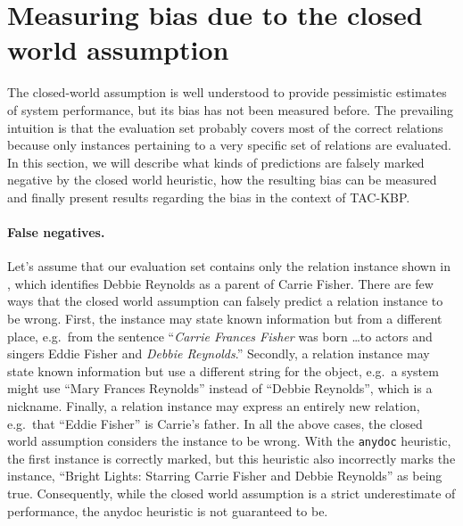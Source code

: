 \section{Measuring bias due to the closed world assumption}
\label{sec:analysis}


The closed-world assumption is well understood to provide pessimistic estimates of system performance, but its bias has not been measured before.
The prevailing intuition is that the evaluation set probably covers most of the correct relations because only instances pertaining to a very specific set of relations are evaluated.
In this section, we will describe what kinds of predictions are falsely marked negative by the closed world heuristic, how the resulting bias can be measured and finally present results regarding the bias in the context of TAC-KBP.

\paragraph{False negatives.}
Let's assume that our evaluation set contains only the relation instance shown in , which identifies Debbie Reynolds as a parent of Carrie Fisher.
There are few ways that the closed world assumption can falsely predict a relation instance to be wrong.
First, the instance may state known information but from a different place, e.g.\ from the sentence 
  ``\textit{Carrie Frances Fisher} was born \ldots to actors and singers Eddie Fisher and \textit{Debbie Reynolds}.''
Secondly, a relation instance may state known information but use a different string for the object, e.g.\ a system might use ``Mary Frances Reynolds'' instead of ``Debbie Reynolds'', which is a nickname.
Finally, a relation instance may express an entirely new relation, e.g.\ that ``Eddie Fisher'' is Carrie's father.
In all the above cases, the closed world assumption considers the instance to be wrong.
With the \texttt{anydoc} heuristic, the first instance is correctly marked, but this heuristic also incorrectly marks the instance, ``Bright Lights: Starring Carrie Fisher and Debbie Reynolds'' as being true.
Consequently, 
  while the closed world assumption is a strict underestimate of performance, the anydoc heuristic is not guaranteed to be.


